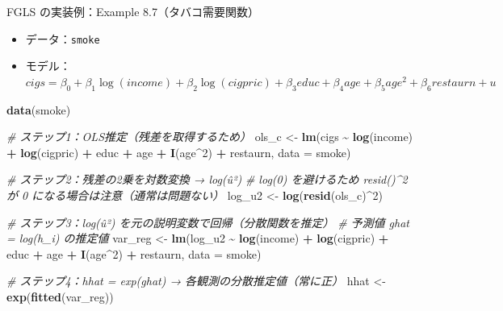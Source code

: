 \documentclass[
  ignorenonframetext,
]{beamer}
\newenvironment{Shaded}{\begin{snugshade}}{\end{snugshade}}
\newcommand{\AttributeTok}[1]{\textcolor[rgb]{0.13,0.29,0.53}{#1}}
\newcommand{\CommentTok}[1]{\textcolor[rgb]{0.56,0.35,0.01}{\textit{#1}}}
\newcommand{\DecValTok}[1]{\textcolor[rgb]{0.00,0.00,0.81}{#1}}
\newcommand{\FunctionTok}[1]{\textcolor[rgb]{0.13,0.29,0.53}{\textbf{#1}}}
\newcommand{\NormalTok}[1]{#1}
\newcommand{\OtherTok}[1]{\textcolor[rgb]{0.56,0.35,0.01}{#1}}
\newcommand{\SpecialCharTok}[1]{\textcolor[rgb]{0.81,0.36,0.00}{\textbf{#1}}}
\providecommand{\tightlist}{%
  \setlength{\itemsep}{0pt}\setlength{\parskip}{0pt}}
\begin{document}
\begin{frame}[fragile]{FGLS の実装例：Example 8.7（タバコ需要関数）}
\label{fgls-ux306eux5b9fux88c5ux4f8bexample-8.7ux30bfux30d0ux30b3ux9700ux8981ux95a2ux6570}
\begin{itemize}
\tightlist
\item
  データ：\texttt{smoke}
\item
  モデル：\(cigs = \beta_0 + \beta_1 \log(income) + \beta_2 \log(cigpric) + \beta_3 educ + \beta_4 age + \beta_5 age^2 + \beta_6 restaurn + u\)
\end{itemize}

\footnotesize

\begin{Shaded}
\begin{Highlighting}[]
\FunctionTok{data}\NormalTok{(smoke)}

\CommentTok{\# ステップ1：OLS推定（残差を取得するため）}
\NormalTok{ols\_c }\OtherTok{\textless{}{-}} \FunctionTok{lm}\NormalTok{(cigs }\SpecialCharTok{\textasciitilde{}} \FunctionTok{log}\NormalTok{(income) }\SpecialCharTok{+} \FunctionTok{log}\NormalTok{(cigpric) }\SpecialCharTok{+}\NormalTok{ educ }\SpecialCharTok{+}
\NormalTok{              age }\SpecialCharTok{+} \FunctionTok{I}\NormalTok{(age}\SpecialCharTok{\^{}}\DecValTok{2}\NormalTok{) }\SpecialCharTok{+}\NormalTok{ restaurn, }\AttributeTok{data =}\NormalTok{ smoke)}
\end{Highlighting}
\end{Shaded}

\normalsize
\end{frame}

\begin{frame}[fragile]
\footnotesize

\begin{Shaded}
\begin{Highlighting}[]
\CommentTok{\# ステップ2：残差の2乗を対数変換 → log(û²)}
\CommentTok{\# log(0) を避けるため resid()\^{}2 が 0 になる場合は注意（通常は問題ない）}
\NormalTok{log\_u2 }\OtherTok{\textless{}{-}} \FunctionTok{log}\NormalTok{(}\FunctionTok{resid}\NormalTok{(ols\_c)}\SpecialCharTok{\^{}}\DecValTok{2}\NormalTok{)}

\CommentTok{\# ステップ3：log(û²) を元の説明変数で回帰（分散関数を推定）}
\CommentTok{\# 予測値 ghat = log(h\_i) の推定値}
\NormalTok{var\_reg }\OtherTok{\textless{}{-}} \FunctionTok{lm}\NormalTok{(log\_u2 }\SpecialCharTok{\textasciitilde{}} \FunctionTok{log}\NormalTok{(income) }\SpecialCharTok{+} \FunctionTok{log}\NormalTok{(cigpric) }\SpecialCharTok{+}\NormalTok{ educ }\SpecialCharTok{+}
\NormalTok{                age }\SpecialCharTok{+} \FunctionTok{I}\NormalTok{(age}\SpecialCharTok{\^{}}\DecValTok{2}\NormalTok{) }\SpecialCharTok{+}\NormalTok{ restaurn, }\AttributeTok{data =}\NormalTok{ smoke)}

\CommentTok{\# ステップ4：hhat = exp(ghat) → 各観測の分散推定値（常に正）}
\NormalTok{hhat }\OtherTok{\textless{}{-}} \FunctionTok{exp}\NormalTok{(}\FunctionTok{fitted}\NormalTok{(var\_reg))}
\end{Highlighting}
\end{Shaded}

\normalsize
\end{frame}
\end{document}
